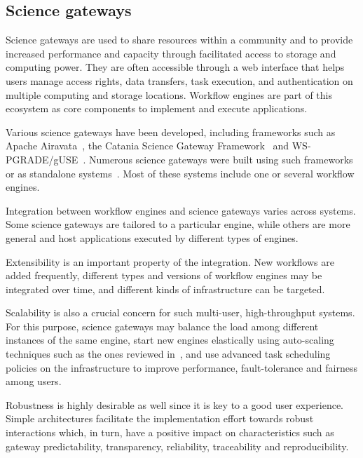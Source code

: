 \documentclass[preprint,3p,twocolumn]{elsarticle}
\begin{document}
\subsection{Science gateways}

\label{sec:intro_sg}

Science gateways are used to share resources within a community and to
provide increased performance and capacity through facilitated access
to storage and computing power. They are often accessible through a
web interface that helps users manage access rights, data transfers,
task execution, and authentication on multiple computing and storage
locations. Workflow engines are part of this ecosystem as core
components to implement and execute
applications. 

Various science gateways have been developed, including frameworks
such as Apache Airavata~\cite{marru2011apache}, the Catania Science
Gateway Framework~\cite{ardizzone2012decide} and
WS-PGRADE/gUSE~\cite{Kacsuk2012}. Numerous science gateways were built
using such frameworks~\cite{kacsuk2014science,ardizzone2012decide} or
as standalone systems~\cite{SHER-14,GLAT-13}. Most of these systems
include one or several workflow engines.

Integration between workflow engines and science gateways varies
across systems. Some science gateways are tailored to a particular
engine, while others are more general and host applications
executed by different types of engines. %

Extensibility is an important property of the integration. New
workflows are added frequently, different types and versions of
workflow engines may be integrated over time, and different kinds of
infrastructure can be targeted. 

Scalability is also a crucial concern for such multi-user,
high-throughput systems. For this purpose, science gateways may
balance the load among different instances of the same engine, start
new engines elastically using auto-scaling techniques such as the ones
reviewed in~\cite{lorido2012auto}, and use advanced task scheduling
policies on the infrastructure to improve performance, fault-tolerance
and fairness among users.

Robustness is highly desirable as well since it is key to a
good user experience. Simple architectures facilitate the
implementation effort towards robust interactions which, in turn, have
a positive impact on characteristics such as gateway predictability,
transparency, reliability, traceability and
reproducibility. 
\end{document}
